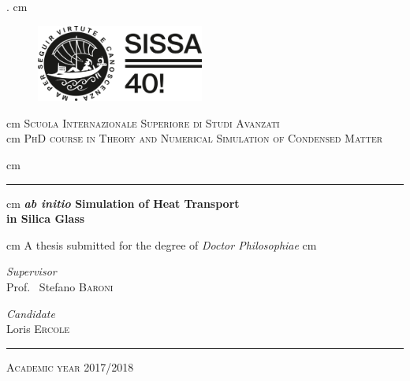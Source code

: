 \begin{titlepage}
\begin{center}

  . cm

%
 \begin{figure}[h]
 \centering
 \includegraphics[width=5.5cm]{frontmatter/SISSA_40_alt.png}
 \end{figure}
 cm
\textsc{\Large Scuola Internazionale Superiore di Studi Avanzati}\\ %

 cm
\textsc{\fontsize{10}{12} PhD course in Theory and Numerical Simulation of Condensed Matter}

 cm
\hrule height 1.1 pt
 cm
{ \fontsize{20}{22} \bfseries  \emph{ab initio} Simulation of Heat Transport \\
\vspace{0.4cm}
in Silica Glass
}

 cm
{A thesis submitted for the degree of \textit{Doctor Philosophiae}}
 cm


\begin{flushleft} \normalsize
\emph{Supervisor}\\
Prof. ~Stefano  \textsc{Baroni}
\end{flushleft}
\vspace{-42 pt}
\hspace{9.6cm}
\begin{minipage}{4.2cm}
\begin{flushleft} \normalsize
\emph{Candidate} \\
Loris  \textsc{Ercole}
\end{flushleft}
\end{minipage}
\vspace{1.5cm}
\hrule height 1.1 pt
\vskip 0.3cm
\textsc{\large Academic year 2017/2018}


\end{center}

\end{titlepage} 